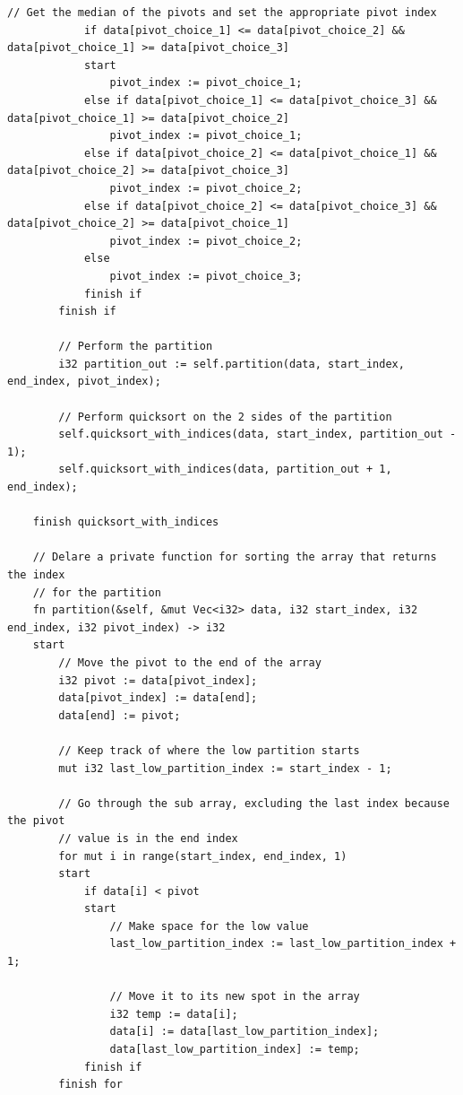 \documentclass[letterpaper, 10pt, DIV=13]{scrartcl}
\numberwithin{equation}{section}
\numberwithin{figure}{section}
\numberwithin{table}{section}
\begin{document}
\begin{lstlisting}[caption = SortsAndShuffles.rez, frame = single, nolol]
            // Get the median of the pivots and set the appropriate pivot index
            if data[pivot_choice_1] <= data[pivot_choice_2] && data[pivot_choice_1] >= data[pivot_choice_3]
            start
                pivot_index := pivot_choice_1;
            else if data[pivot_choice_1] <= data[pivot_choice_3] && data[pivot_choice_1] >= data[pivot_choice_2]
                pivot_index := pivot_choice_1;
            else if data[pivot_choice_2] <= data[pivot_choice_1] && data[pivot_choice_2] >= data[pivot_choice_3]
                pivot_index := pivot_choice_2;
            else if data[pivot_choice_2] <= data[pivot_choice_3] && data[pivot_choice_2] >= data[pivot_choice_1]
                pivot_index := pivot_choice_2;
            else
                pivot_index := pivot_choice_3;
            finish if
        finish if
        
        // Perform the partition
        i32 partition_out := self.partition(data, start_index, end_index, pivot_index);

        // Perform quicksort on the 2 sides of the partition
        self.quicksort_with_indices(data, start_index, partition_out - 1);
        self.quicksort_with_indices(data, partition_out + 1, end_index);

    finish quicksort_with_indices

    // Delare a private function for sorting the array that returns the index
    // for the partition
    fn partition(&self, &mut Vec<i32> data, i32 start_index, i32 end_index, i32 pivot_index) -> i32
    start
        // Move the pivot to the end of the array
        i32 pivot := data[pivot_index];
        data[pivot_index] := data[end];
        data[end] := pivot;

        // Keep track of where the low partition starts
        mut i32 last_low_partition_index := start_index - 1;

        // Go through the sub array, excluding the last index because the pivot
        // value is in the end index
        for mut i in range(start_index, end_index, 1)
        start
            if data[i] < pivot
            start
                // Make space for the low value
                last_low_partition_index := last_low_partition_index + 1;

                // Move it to its new spot in the array
                i32 temp := data[i];
                data[i] := data[last_low_partition_index];
                data[last_low_partition_index] := temp;
            finish if
        finish for


\end{lstlisting}
\end{document}
